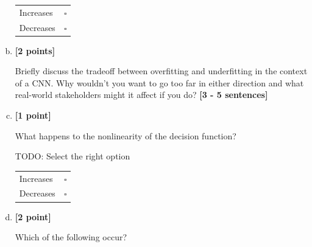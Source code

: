 \begin{enumerate}[(a)]
\begin{tcolorbox}[colback=white!5!white,colframe=green!75!black]
\begin{tabular}[h]{lr}
\toprule
Increases & $\square$ \\
Decreases & $\square$ \\
\bottomrule
\end{tabular}
    \end{tcolorbox}

    \item \textbf{[2 points]} 
    \begin{tcolorbox}[colback=orange!5!white,colframe=orange!75!black]
    Briefly discuss the tradeoff between overfitting and underfitting in the context of a CNN. Why wouldn't you want to go too far in either direction and what real-world stakeholders might it affect if you do? \textbf{[3 - 5 sentences]}
    \end{tcolorbox}
    
    \item \textbf{[1 point]}
    \begin{tcolorbox}[colback=orange!5!white,colframe=orange!75!black]
    What happens to the nonlinearity of the decision function?
    \end{tcolorbox}
    \begin{tcolorbox}[colback=white!5!white,colframe=green!75!black]
    TODO: Select the right option %

\begin{tabular}[h]{lr}
\toprule
Increases & $\square$ \\
Decreases & $\square$ \\
\bottomrule
\end{tabular}
    \end{tcolorbox}

\item \textbf{[2 point]}
\begin{tcolorbox}[colback=orange!5!white,colframe=orange!75!black]
Which of the following occur?
\end{tcolorbox}


\end{enumerate}
